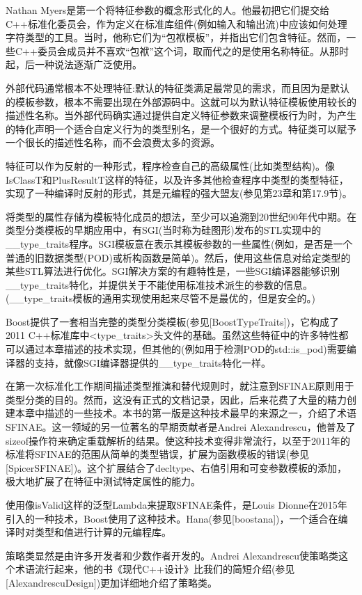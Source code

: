 Nathan Myers是第一个将特征参数的概念形式化的人。他最初把它们提交给C++标准化委员会，作为定义在标准库组件(例如输入和输出流)中应该如何处理字符类型的工具。当时，他称它们为“包袱模板”，并指出它们包含特征。然而，一些C++委员会成员并不喜欢“包袱”这个词，取而代之的是使用名称特征。从那时起，后一种说法逐渐广泛使用。

外部代码通常根本不处理特征:默认的特征类满足最常见的需求，而且因为是默认的模板参数，根本不需要出现在外部源码中。这就可以为默认特征模板使用较长的描述性名称。当外部代码确实通过提供自定义特征参数来调整模板行为时，为产生的特化声明一个适合自定义行为的类型别名，是一个很好的方式。特征类可以赋予一个很长的描述性名称，而不会浪费太多的资源。

特征可以作为反射的一种形式，程序检查自己的高级属性(比如类型结构)。像IsClassT和PlusResultT这样的特征，以及许多其他检查程序中类型的类型特征，实现了一种编译时反射的形式，其是元编程的强大盟友(参见第23章和第17.9节)。

将类型的属性存储为模板特化成员的想法，至少可以追溯到20世纪90年代中期。在类型分类模板的早期应用中，有SGI(当时称为硅图形)发布的STL实现中的\_\_type\_traits程序。SGI模板意在表示其模板参数的一些属性(例如，是否是一个普通的旧数据类型(POD)或析构函数是简单)。然后，使用这些信息对给定类型的某些STL算法进行优化。SGI解决方案的有趣特性是，一些SGI编译器能够识别\_\_type\_traits特化，并提供关于不能使用标准技术派生的参数的信息。(\_\_type\_traits模板的通用实现使用起来尽管不是最优的，但是安全的。)

Boost提供了一套相当完整的类型分类模板(参见[BoostTypeTraits])，它构成了2011 C++标准库中<type\_traits>头文件的基础。虽然这些特征中的许多特性都可以通过本章描述的技术实现，但其他的(例如用于检测POD的std::is\_pod)需要编译器的支持，就像SGI编译器提供的\_\_type\_traits特化一样。

在第一次标准化工作期间描述类型推演和替代规则时，就注意到SFINAE原则用于类型分类的目的。然而，这没有正式的文档记录，因此，后来花费了大量的精力创建本章中描述的一些技术。本书的第一版是这种技术最早的来源之一，介绍了术语SFINAE。这一领域的另一位著名的早期贡献者是Andrei Alexandrescu，他普及了sizeof操作符来确定重载解析的结果。使这种技术变得非常流行，以至于2011年的标准将SFINAE的范围从简单的类型错误，扩展为函数模板的错误(参见[SpicerSFINAE])。这个扩展结合了decltype、右值引用和可变参数模板的添加，极大地扩展了在特征中测试特定属性的能力。

使用像isValid这样的泛型Lambda来提取SFINAE条件，是Louis Dionne在2015年引入的一种技术，Boost使用了这种技术。Hana(参见[boostana])，一个适合在编译时对类型和值进行计算的元编程库。

策略类显然是由许多开发者和少数作者开发的。Andrei Alexandrescu使策略类这个术语流行起来，他的书《现代C++设计》比我们的简短介绍(参见[AlexandrescuDesign])更加详细地介绍了策略类。